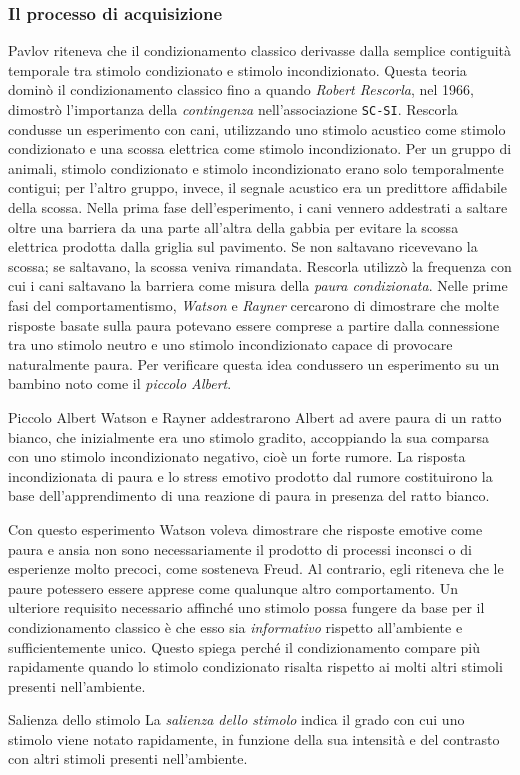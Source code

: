 \documentclass[a4paper]{article}
\begin{document}
\subsubsection{Il processo di acquisizione}
Pavlov riteneva che il condizionamento classico derivasse dalla semplice contiguità temporale tra stimolo condizionato e stimolo incondizionato. Questa teoria dominò il condizionamento classico fino a quando \emph{Robert Rescorla}, nel 1966, dimostrò l'importanza della \emph{contingenza} nell'associazione \texttt{SC-SI}.
Rescorla condusse un esperimento con cani, utilizzando uno stimolo acustico come stimolo condizionato e una scossa elettrica come stimolo incondizionato. Per un gruppo di animali, stimolo condizionato e stimolo incondizionato erano solo temporalmente contigui; per l'altro gruppo, invece, il segnale acustico era un predittore affidabile della scossa.
Nella prima fase dell'esperimento, i cani vennero addestrati a saltare oltre una barriera da una parte all'altra della gabbia per evitare la scossa elettrica prodotta dalla griglia sul pavimento. Se non saltavano ricevevano la scossa; se saltavano, la scossa veniva rimandata. Rescorla utilizzò la frequenza con cui i cani saltavano la barriera come misura della \emph{paura condizionata}.
Nelle prime fasi del comportamentismo, \emph{Watson} e \emph{Rayner} cercarono di dimostrare che molte risposte basate sulla paura potevano essere comprese a partire dalla connessione tra uno stimolo neutro e uno stimolo incondizionato capace di provocare naturalmente paura. Per verificare questa idea condussero un esperimento su un bambino noto come il \emph{piccolo Albert}.
\begin{snippetexample}{Piccolo Albert}
    Watson e Rayner addestrarono Albert ad avere paura di un ratto bianco, che inizialmente era uno stimolo gradito, accoppiando la sua comparsa con uno stimolo incondizionato negativo, cioè un forte rumore. La risposta incondizionata di paura e lo stress emotivo prodotto dal rumore costituirono la base dell'apprendimento di una reazione di paura in presenza del ratto bianco.
\end{snippetexample}
Con questo esperimento Watson voleva dimostrare che risposte emotive come paura e ansia non sono necessariamente il prodotto di processi inconsci o di esperienze molto precoci, come sosteneva Freud. Al contrario, egli riteneva che le paure potessero essere apprese come qualunque altro comportamento.
Un ulteriore requisito necessario affinché uno stimolo possa fungere da base per il condizionamento classico è che esso sia \emph{informativo} rispetto all'ambiente e sufficientemente unico. Questo spiega perché il condizionamento compare più rapidamente quando lo stimolo condizionato risalta rispetto ai molti altri stimoli presenti nell'ambiente.
\begin{snippetdefinition}{Salienza dello stimolo}
    La \emph{salienza dello stimolo} indica il grado con cui uno stimolo viene notato rapidamente, in funzione della sua intensità e del contrasto con altri stimoli presenti nell'ambiente.
\end{snippetdefinition}
\end{document}
